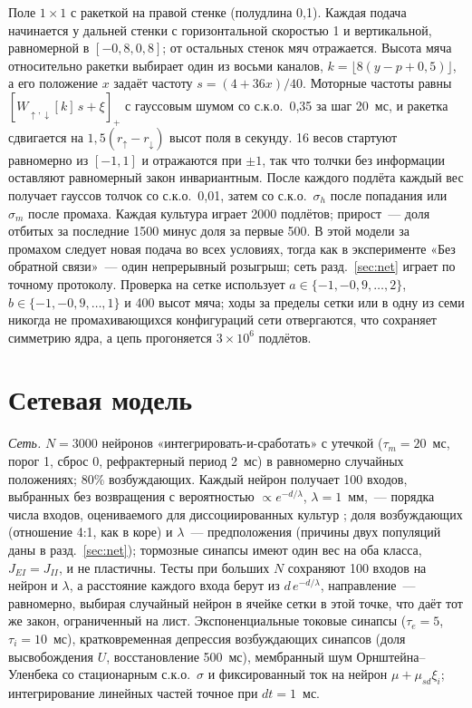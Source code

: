 \documentclass[pre,twocolumn,superscriptaddress,showpacs=false,amsmath,amssymb,nofootinbib]{revtex4-2}
\begin{document}
Поле $1\times1$ с ракеткой на правой стенке (полудлина 0{,}1). Каждая подача начинается у дальней стенки с горизонтальной скоростью 1 и вертикальной, равномерной в $[-0{,}8,0{,}8]$; от остальных стенок мяч отражается. Высота мяча относительно ракетки выбирает один из восьми каналов, $k=\lfloor8(y-p+0{,}5)\rfloor$, а его положение $x$ задаёт частоту $s=(4+36x)/40$. Моторные частоты равны $[W_{\uparrow,\downarrow}[k]\,s+\xi]_+$ с гауссовым шумом со с.к.о.\ 0{,}35 за шаг 20~мс, и ракетка сдвигается на $1{,}5(r_\uparrow-r_\downarrow)$ высот поля в секунду. 16 весов стартуют равномерно из $[-1,1]$ и отражаются при $\pm1$, так что толчки без информации оставляют равномерный закон инвариантным. После каждого подлёта каждый вес получает гауссов толчок со с.к.о.\ 0{,}01, затем со с.к.о.\ $\sigma_h$ после попадания или $\sigma_m$ после промаха. Каждая культура играет 2000 подлётов; прирост~--- доля отбитых за последние 1500 минус доля за первые 500. В этой модели за промахом следует новая подача во всех условиях, тогда как в эксперименте «Без обратной связи»~--- один непрерывный розыгрыш; сеть разд.~\ref{sec:net} играет по точному протоколу. Проверка на сетке использует $a\in\{-1,-0{,}9,\dots,2\}$, $b\in\{-1,-0{,}9,\dots,1\}$ и 400 высот мяча; ходы за пределы сетки или в одну из семи никогда не промахивающихся конфигураций сети отвергаются, что сохраняет симметрию ядра, а цепь прогоняется $3\times10^6$ подлётов.

\section{Сетевая модель}\label{app:net}

\emph{Сеть.} $N=3000$ нейронов «интегрировать-и-сработать» с утечкой ($\tau_m=20$~мс, порог 1, сброс 0, рефрактерный период 2~мс) в равномерно случайных положениях; 80\% возбуждающих. Каждый нейрон получает 100 входов, выбранных без возвращения с вероятностью $\propto e^{-d/\lambda}$, $\lambda=1$~мм,~--- порядка числа входов, оцениваемого для диссоциированных культур \cite{Soriano2008}; доля возбуждающих (отношение 4:1, как в коре) и $\lambda$~--- предположения (причины двух популяций даны в разд.~\ref{sec:net}); тормозные синапсы имеют один вес на оба класса, $J_{EI}=J_{II}$, и не пластичны. Тесты при больших $N$ сохраняют 100 входов на нейрон и $\lambda$, а расстояние каждого входа берут из $d\,e^{-d/\lambda}$, направление~--- равномерно, выбирая случайный нейрон в ячейке сетки в этой точке, что даёт тот же закон, ограниченный на лист. Экспоненциальные токовые синапсы ($\tau_e=5$, $\tau_i=10$~мс), кратковременная депрессия возбуждающих синапсов (доля высвобождения $U$, восстановление 500~мс), мембранный шум Орнштейна--Уленбека со стационарным с.к.о.\ $\sigma$ и фиксированный ток на нейрон $\mu+\mu_{sd}\xi_i$; интегрирование линейных частей точное при $dt=1$~мс.
\end{document}
